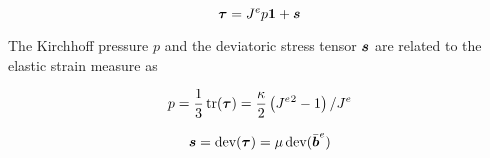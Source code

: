 \begin{equation}\label{eq:Kirchhoff}
{\boldsymbol{\tau}}=J^e p {\boldsymbol{1}} + {\boldsymbol{s}}
\end{equation}

The Kirchhoff pressure $p$ and the deviatoric stress tensor ${\boldsymbol{s}}$ are
related to the elastic strain measure as

\begin{equation}\label{eq:p}
p = \frac{1}{3}\operatorname{\text{tr}}({\boldsymbol{\tau}}) = \frac{\kappa}{2}\left(J^e{^2}-1\right)/J^e
\end{equation}

\begin{equation}\label{eq:s}
{\boldsymbol{s}} = \operatorname{\text{dev}}({\boldsymbol{\tau}}) = \mu\operatorname{\text{dev}}(\bar{{\boldsymbol{b}}}^e)
\end{equation}


